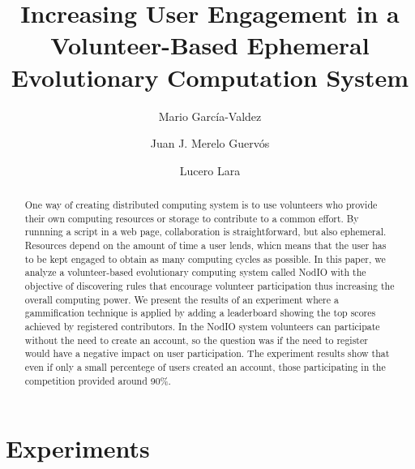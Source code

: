 \documentclass{llncs}
\begin{document}
\sloppy

\title{Increasing User Engagement in a Volunteer-Based Ephemeral Evolutionary Computation System}


\author{Mario Garc\'ia-Valdez \and Juan J. Merelo Guerv\'os \and  Lucero Lara }



\maketitle


\begin{abstract}

One way of creating distributed computing system is to use volunteers who
provide their own computing resources or storage to contribute to a common effort.
By runnning a script in a web page, collaboration is straightforward, but also ephemeral.
Resources depend on the amount of time a user lends, whicn means that 
the user has to be kept engaged to obtain as many computing cycles as
possible. In this paper, we analyze a volunteer-based evolutionary computing system called
NodIO with the objective of discovering rules that encourage volunteer
participation thus increasing the overall computing power. We present the results of
an experiment where a gammification technique is applied by adding a leaderboard 
showing the top scores achieved by registered contributors. In the NodIO system volunteers can
participate without the need to create an account, so the question was
if the need to register would have a negative impact on user participation. 
The experiment results show that even if only a small percentege of users created an account,
those participating in the competition provided around 90\%.

\end{abstract}

\section{Experiments}
\label{sec:experiments}
\end{document}
